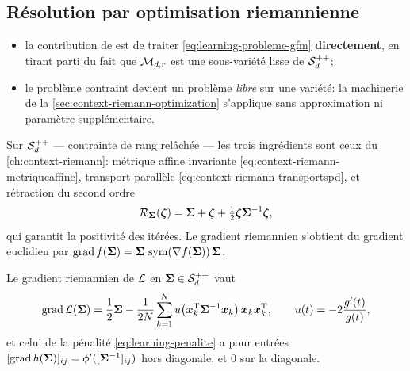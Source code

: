 \subsection{Résolution par optimisation riemannienne}
\label{subsec:learning-resolution-graphe}

\begin{itemize}
  \item la contribution de  est de traiter
    \cref{eq:learning-probleme-gfm} \textbf{directement}, en tirant parti du
    fait que $\mathcal{M}_{d,r}$ est une sous-variété lisse de
    $\mathcal{S}_{d}^{++}$;
  \item le problème contraint devient un problème \emph{libre} sur une
    variété: la machinerie de la \cref{sec:context-riemann-optimization}
    s'applique sans approximation ni paramètre supplémentaire.
\end{itemize}

Sur $\mathcal{S}_{d}^{++}$ --- contrainte de rang relâchée --- les trois ingrédients
sont ceux du \cref{ch:context-riemann}: métrique affine invariante
\cref{eq:context-riemann-metriqueaffine}, transport parallèle
\cref{eq:context-riemann-transportspd}, et rétraction du second ordre
\begin{equation}
  \mathcal{R}_{\boldsymbol{\Sigma}}(\boldsymbol{\zeta})=\boldsymbol{\Sigma}+\boldsymbol{\zeta}+\tfrac{1}{2}\boldsymbol{\zeta}{\boldsymbol{\Sigma}}^{-1}\boldsymbol{\zeta},
  \label{eq:learning-retraction-spd}
\end{equation}
qui garantit la positivité des itérées. Le gradient riemannien s'obtient du
gradient euclidien par
$\operatorname{\operatorname{grad}} f(\boldsymbol{\Sigma})=\boldsymbol{\Sigma}\,\operatorname{\operatorname{sym}}(\nabla f(\boldsymbol{\Sigma}))\,\boldsymbol{\Sigma}$.

\begin{proposition}
\label{prop:learning-gradient-nll}
  Le gradient riemannien de $\mathcal{L}$ en $\boldsymbol{\Sigma}\in\mathcal{S}_{d}^{++}$ vaut
  \begin{equation}
    \operatorname{\operatorname{grad}}\mathcal{L}(\boldsymbol{\Sigma})
    =
    \frac{1}{2}\boldsymbol{\Sigma}
    -\frac{1}{2N}\sum_{k=1}^{N}
    u\!\left(\boldsymbol{x}_k^{\mathrm{T}}{\boldsymbol{\Sigma}}^{-1}\boldsymbol{x}_k\right)\boldsymbol{x}_k\boldsymbol{x}_k^{\mathrm{T}},
    \qquad
    u(t)=-2\frac{g'(t)}{g(t)},
    \label{eq:learning-gradient-nll}
  \end{equation}
  et celui de la pénalité \cref{eq:learning-penalite} a pour entrées
  $[\operatorname{\operatorname{grad}}h(\boldsymbol{\Sigma})]_{ij}=\phi'([{\boldsymbol{\Sigma}}^{-1}]_{ij})$
  hors diagonale, et $0$ sur la diagonale.
\end{proposition}

